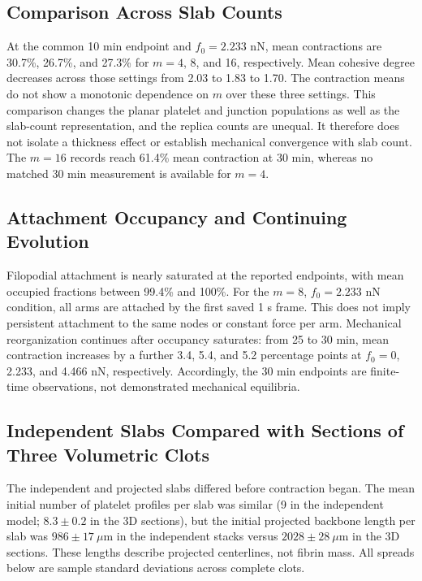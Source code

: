 \subsection{Comparison Across Slab Counts}
At the common 10 min endpoint and $f_0=2.233$ nN, mean contractions are 30.7\%, 26.7\%, and 27.3\% for $m=4$, 8, and 16, respectively. Mean cohesive degree decreases across those settings from 2.03 to 1.83 to 1.70. The contraction means do not show a monotonic dependence on $m$ over these three settings. This comparison changes the planar platelet and junction populations as well as the slab-count representation, and the replica counts are unequal. It therefore does not isolate a thickness effect or establish mechanical convergence with slab count. The $m=16$ records reach 61.4\% mean contraction at 30 min, whereas no matched 30 min measurement is available for $m=4$.

\subsection{Attachment Occupancy and Continuing Evolution}
Filopodial attachment is nearly saturated at the reported endpoints, with mean occupied fractions between 99.4\% and 100\%. For the $m=8$, $f_0=2.233$ nN condition, all arms are attached by the first saved 1 s frame. This does not imply persistent attachment to the same nodes or constant force per arm. Mechanical reorganization continues after occupancy saturates: from 25 to 30 min, mean contraction increases by a further 3.4, 5.4, and 5.2 percentage points at $f_0=0$, 2.233, and 4.466 nN, respectively. Accordingly, the 30 min endpoints are finite-time observations, not demonstrated mechanical equilibria.

\subsection{Independent Slabs Compared with Sections of Three Volumetric Clots}
\label{sec:virtual-comparison}
The independent and projected slabs differed before contraction began. The mean initial number of platelet profiles per slab was similar (9 in the independent model; $8.3\pm0.2$ in the 3D sections), but the initial projected backbone length per slab was $986\pm17~\mu\mathrm m$ in the independent stacks versus $2028\pm28~\mu\mathrm m$ in the 3D sections. These lengths describe projected centerlines, not fibrin mass. All spreads below are sample standard deviations across complete clots.

